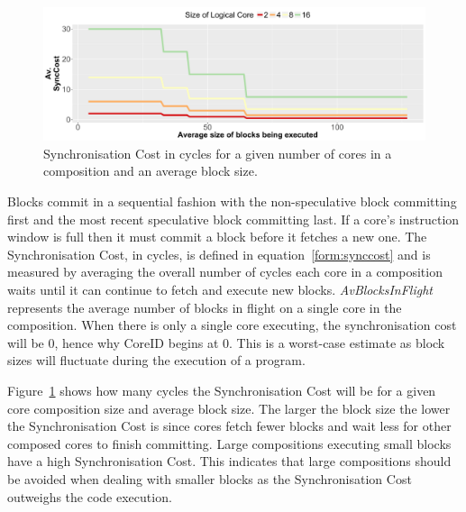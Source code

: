 \begin{figure}[t]
    \centering
    \includegraphics[width=\textwidth]{cases-paper/graphics/limit_study/sync_cost.pdf}

    \caption{Synchronisation Cost in cycles for a given number of cores in a composition and an average block size.} %
    \label{fig:sync_cost}
	\vspace{1em}
\end{figure}
Blocks commit in a sequential fashion with the non-speculative block committing first and the most recent speculative block committing last.
If a core's instruction window is full then it must commit a block before it fetches a new one.
The Synchronisation Cost, in cycles, is defined in equation~\ref{form:synccost} and is measured by averaging the overall number of cycles each core in a composition waits until it can continue to fetch and execute new blocks.
\textit{AvBlocksInFlight} represents the average number of blocks in flight on a single core in the composition.
When there is only a single core executing, the synchronisation cost will be 0, hence why CoreID begins at 0.
This is a worst-case estimate as block sizes will fluctuate during the execution of a program.

Figure~\ref{fig:sync_cost} shows how many cycles the Synchronisation Cost will be for a given core composition size and average block size.
The larger the block size the lower the Synchronisation Cost is since cores fetch fewer blocks and wait less for other composed cores to finish committing.
Large compositions executing small blocks have a high Synchronisation Cost. 
This indicates that large compositions should be avoided when dealing with smaller blocks as the Synchronisation Cost outweighs the code execution.




